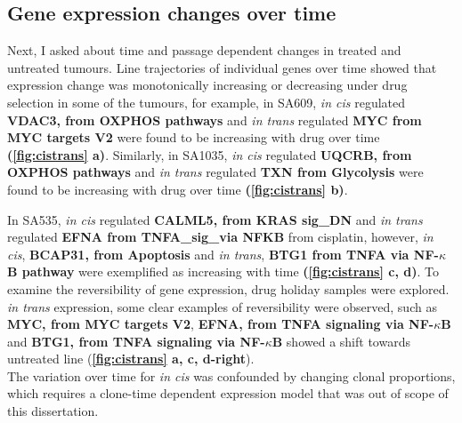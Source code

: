 
\subsection{Gene expression changes over time}


Next, I asked  about time and passage dependent changes in treated and untreated tumours. Line trajectories of individual genes over time showed that expression change was monotonically increasing or decreasing under drug selection in some of the tumours, for example, in SA609, \textit{in cis} regulated \textbf{VDAC3, from OXPHOS pathways} and \textit{in trans} regulated \textbf{MYC from MYC targets V2} were found to be increasing with drug over time \textbf{(\autoref{fig:cistrans} a)}. 
Similarly, in SA1035, \textit{in cis} regulated \textbf{UQCRB, from OXPHOS pathways} and \textit{in trans} regulated \textbf{TXN from Glycolysis} were found to be increasing with drug over time \textbf{(\autoref{fig:cistrans} b)}. 

In SA535, \textit{in cis} regulated \textbf{CALML5, from KRAS sig\_DN} and \textit{in trans} regulated \textbf{EFNA from TNFA\_sig\_via NFKB} from cisplatin, however, \textit{in cis}, \textbf{BCAP31, from Apoptosis} and \textit{in trans}, \textbf{BTG1 from TNFA via NF-$\kappa$B pathway} were exemplified as increasing with time \textbf{(\autoref{fig:cistrans} c, d)}. 
To examine the reversibility of gene expression, drug holiday samples were explored. \textit{in trans} expression, some clear examples of reversibility were observed, such as \textbf{MYC, from MYC targets V2}, \textbf{EFNA, from TNFA signaling via NF-$\kappa$B} and \textbf{BTG1, from TNFA signaling via NF-$\kappa$B} showed a shift towards untreated line (\textbf{\autoref{fig:cistrans} a, c, d-right}). 
\\
The variation over time for \textit{in cis} was confounded by changing clonal proportions, which requires a clone-time dependent expression model that was out of scope of this dissertation.


